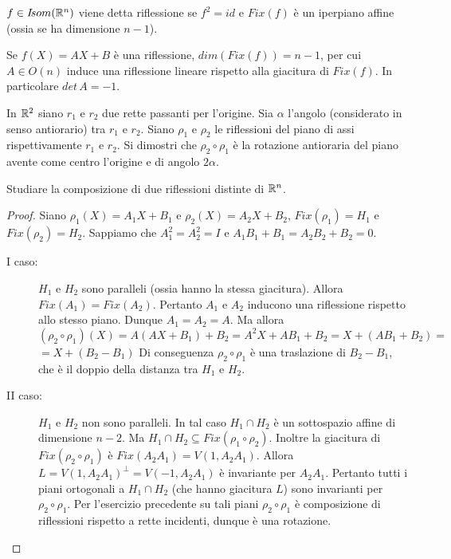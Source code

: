  $f\in I\!som( \mathbb R^n )$ viene detta riflessione se $f^2=id$ e $Fix(f)$ 
 è un iperpiano affine (ossia se ha dimensione $n-1$).
 
 \begin{remark}
 Se $f(X)=AX+B$ è una riflessione, $dim(Fix(f))=n-1$, per cui
 $A\in O(n)$ induce una riflessione lineare rispetto alla giacitura di $Fix(f)$. In particolare $det\,A=-1$.
 \end{remark}
 
 \begin{exercise}
In $\mathbb R^2$ siano $r_1$ e $r_2$ due rette passanti per l'origine. Sia $\alpha$
 l'angolo (considerato in senso antiorario) tra $r_1$ e $r_2$. Siano $\rho_1$ e $\rho_2$
 le riflessioni del piano di assi rispettivamente $r_1$ e $r_2$.
 Si dimostri che $\rho_2\circ\rho_1$ è la rotazione antioraria del piano avente come centro l'origine e di angolo 
 $2\alpha$.
 \end{exercise}
 
 \begin{exercise}
 Studiare la composizione di due riflessioni distinte di $\mathbb R^n$.
 \end{exercise}
 
 \begin{proof}
Siano $\rho_1(X)=A_1X+B_1$ e $\rho_2(X)=A_2X+B_2$, $Fix(\rho_1)=H_1$ e
 $Fix(\rho_2)=H_2$. 
 Sappiamo che $A_1^2=A_2^2=I$ e $A_1B_1+B_1=A_2B_2+B_2=0$.
 
 \begin{description}
  \item[I caso:] $H_1$ e $H_2$ sono paralleli (ossia hanno la stessa giacitura).
 Allora $Fix(A_1)=Fix(A_2)$. Pertanto $A_1$ e $A_2$ inducono una riflessione rispetto allo stesso piano.
 Dunque $A_1=A_2=A$.
 Ma allora $(\rho_2\circ\rho_1)(X)=A(AX+B_1)+B_2=A^2X+AB_1+B_2=X+(AB_1+B_2)=$
 $=X+(B_2-B_1)$
 Di conseguenza $\rho_2\circ\rho_1$ è una traslazione di $B_2-B_1$, che è il doppio della distanza tra
 $H_1$ e $H_2$.
 \item[II caso: ] $H_1$ e $H_2$ non sono paralleli.
 In tal caso $H_1\cap H_2$ è un sottospazio affine di dimensione $n-2$.
 Ma $H_1\cap H_2\subseteq Fix(\rho_1\circ\rho_2)$.
 Inoltre la giacitura di $Fix(\rho_2\circ\rho_1)$ è
 $Fix(A_2A_1)=V(1,A_2A_1)$. Allora $L=V(1,A_2A_1)^{\bot}=V(-1,A_2A_1)$ è invariante per $A_2A_1$.
 Pertanto tutti i piani ortogonali a $H_1\cap H_2$ (che hanno giacitura $L$) sono invarianti per
 $\rho_2\circ\rho_1$.
 Per l'esercizio precedente su tali piani $\rho_2\circ\rho_1$ è composizione di riflessioni rispetto a rette incidenti,
 dunque è una rotazione.
 \end{description}
 \end{proof}
 
